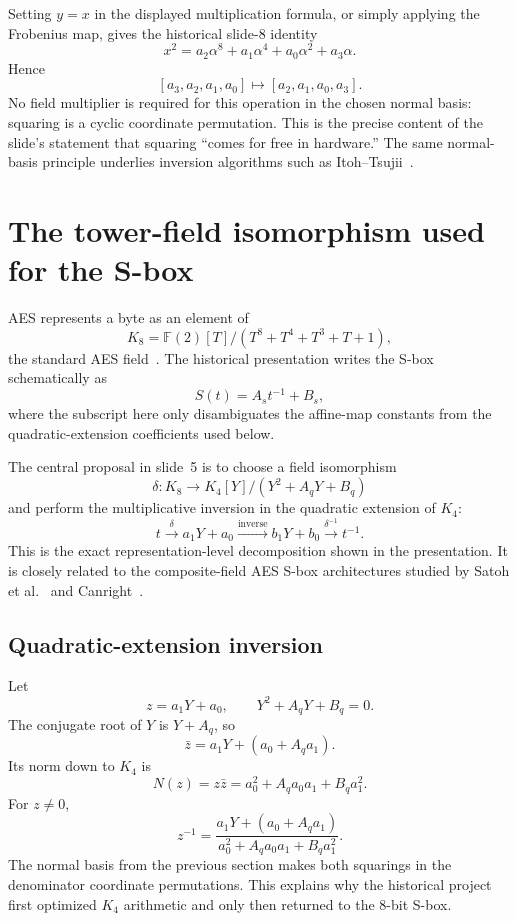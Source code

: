 \documentclass[11pt]{article}
\newcommand{\GF}{\mathbb{F}}
\begin{document}
Setting $y=x$ in the displayed multiplication formula, or simply applying the
Frobenius map, gives the historical slide-8 identity
\[
  x^2
  =
  a_2\alpha^8+a_1\alpha^4+a_0\alpha^2+a_3\alpha.
\]
Hence
\[
  [a_3,a_2,a_1,a_0]
  \longmapsto
  [a_2,a_1,a_0,a_3].
\]
No field multiplier is required for this operation in the chosen normal basis:
squaring is a cyclic coordinate permutation.  This is the precise content of
the slide's statement that squaring ``comes for free in hardware.''  The same
normal-basis principle underlies inversion algorithms such as
Itoh--Tsujii~\cite{itoh1988}.

\section{The tower-field isomorphism used for the S-box}

AES represents a byte as an element of
\[
  K_8
  =
  \GF(2)[T]/(T^8+T^4+T^3+T+1),
\]
the standard AES field~\cite{fips197}.  The historical presentation writes the
S-box schematically as
\[
  S(t)=A_s t^{-1}+B_s,
\]
where the subscript here only disambiguates the affine-map constants from the
quadratic-extension coefficients used below.

The central proposal in slide~5 is to choose a field isomorphism
\[
  \delta:
  K_8
  \longrightarrow
  K_4[Y]/(Y^2+A_qY+B_q)
\]
and perform the multiplicative inversion in the quadratic extension of
$K_4$:
\[
  t
  \xrightarrow{\delta}
  a_1Y+a_0
  \xrightarrow{\mathrm{inverse}}
  b_1Y+b_0
  \xrightarrow{\delta^{-1}}
  t^{-1}.
\]
This is the exact representation-level decomposition shown in the
presentation.  It is closely related to the composite-field AES S-box
architectures studied by Satoh et al.~\cite{satoh2001} and
Canright~\cite{canright2005}.

\subsection{Quadratic-extension inversion}

Let
\[
  z=a_1Y+a_0,
  \qquad
  Y^2+A_qY+B_q=0.
\]
The conjugate root of $Y$ is $Y+A_q$, so
\[
  \bar z
  =
  a_1Y+(a_0+A_q a_1).
\]
Its norm down to $K_4$ is
\[
  N(z)
  =
  z\bar z
  =
  a_0^2+A_q a_0a_1+B_q a_1^2.
\]
For $z\neq 0$,
\[
  z^{-1}
  =
  \frac{a_1Y+(a_0+A_q a_1)}
       {a_0^2+A_q a_0a_1+B_q a_1^2}.
\]
The normal basis from the previous section makes both squarings in the
denominator coordinate permutations.  This explains why the historical
project first optimized $K_4$ arithmetic and only then returned to the
8-bit S-box.
\end{document}

